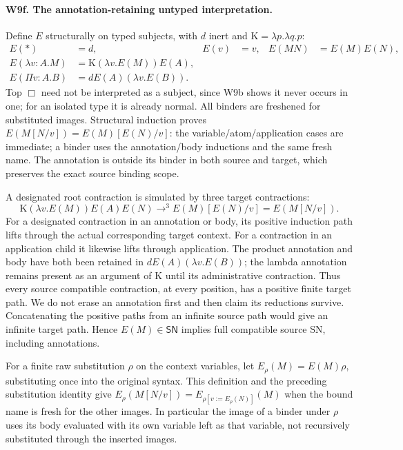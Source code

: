 \paragraph{W9f. The annotation-retaining untyped interpretation.}
Define \(E\) structurally on typed subjects, with \(d\) inert and
\(\mathrm K=\lambda p.\lambda q.p\):
\[
\begin{aligned}
 E(\ast)&=d,& E(v)&=v,& E(MN)&=E(M)E(N),\\
 E(\lambda v:A.M)&=\mathrm K(\lambda v.E(M))E(A),&&&\\
 E(\Pi v:A.B)&=dE(A)(\lambda v.E(B)).&&&
\end{aligned}
\]
Top \(\Box\) need not be interpreted as a subject, since W9b shows
it never occurs in one; for an isolated type it is already normal.
All binders are freshened for substituted images. Structural induction
proves \(E(M[N/v])=E(M)[E(N)/v]\): the variable/atom/application cases
are immediate; a binder uses the annotation/body inductions and the same
fresh name. The annotation is outside its binder in both source and
target, which preserves the exact source binding scope.

A designated root contraction is simulated by three target contractions:
\[
 \mathrm K(\lambda v.E(M))E(A)E(N)
 \longrightarrow^3 E(M)[E(N)/v]=E(M[N/v]).
\]
For a designated contraction in an annotation or body, its positive
induction path lifts through the actual corresponding target context.
For a contraction in an application child it likewise lifts through
application. The product annotation and body have both been retained
in \(dE(A)(\lambda v.E(B))\); the lambda annotation remains present
as an argument of K until its administrative contraction. Thus every
source compatible contraction, at every position, has a positive finite
target path. We do not erase an annotation first and then claim its
reductions survive. Concatenating the positive paths from an infinite
source path would give an infinite target path. Hence \(E(M)\in
\mathsf{SN}\) implies full compatible source SN, including annotations.

For a finite raw substitution \(\rho\) on the context variables, let
\(E_\rho(M)=E(M)\rho\), substituting once into the original syntax.
This definition and the preceding substitution identity give
\(E_\rho(M[N/v])=E_{\rho[v:=E_\rho(N)]}(M)\) when the bound name
is fresh for the other images. In particular the image of a binder
under \(\rho\) uses its body evaluated with its own variable left
as that variable, not recursively substituted through the inserted images.

